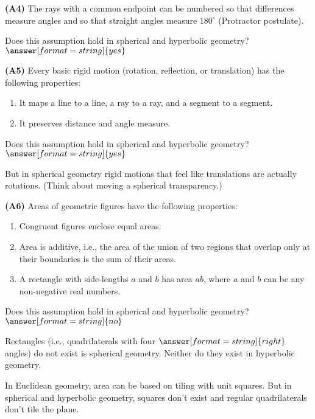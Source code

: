 \documentclass[nooutcomes]{ximera}
\begin{document}
\begin{problem}
\textbf{(A4)} The rays with a common endpoint can be numbered so that differences measure angles and so that straight angles measure $180^\circ$ (Protractor postulate). 

Does this assumption hold in spherical and hyperbolic geometry? 
$\answer[format=string]{yes}$
\end{problem}

\begin{problem}
\textbf{(A5)} Every basic rigid motion (rotation, reflection, or translation) has the following properties:
\begin{enumerate}
\item It maps a line to a line, a ray to a ray, and a segment to a segment.
\item It preserves distance and angle measure.
\end{enumerate}

Does this assumption hold in spherical and hyperbolic geometry? 
$\answer[format=string]{yes}$
\begin{feedback}
But in spherical geometry rigid motions that feel like translations are actually rotations.  (Think about moving a spherical transparency.) 
\end{feedback}
\end{problem}

\begin{problem}
\textbf{(A6)} Areas of geometric figures have the following properties: 
\begin{enumerate}
\item Congruent figures enclose equal areas.
\item Area is additive, i.e., the area of the union of two regions that overlap only at their boundaries is the sum of their areas. 
\item A rectangle with side-lengths $a$ and $b$ has area $ab$, where $a$ and $b$ can be any non-negative real numbers.
\end{enumerate}

Does this assumption hold in spherical and hyperbolic geometry? 
$\answer[format=string]{no}$
\begin{problem}
Rectangles (i.e., quadrilaterals with four $\answer[format=string]{right}$ angles) do not exist is spherical geometry.  Neither do they exist in hyperbolic geometry.  

In Euclidean geometry, area can be based on tiling with unit squares.  But in spherical and hyperbolic geometry, squares don't exist and regular quadrilaterals don't tile the plane.  
\end{problem}
\end{problem}
\end{document}
